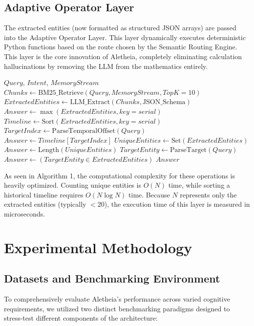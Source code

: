 \documentclass[journal,10pt]{IEEEtran}
\begin{document}
\subsection{Adaptive Operator Layer}
The extracted entities (now formatted as structured JSON arrays) are passed into the Adaptive Operator Layer. This layer dynamically executes deterministic Python functions based on the route chosen by the Semantic Routing Engine. This layer is the core innovation of Aletheia, completely eliminating calculation hallucinations by removing the LLM from the mathematics entirely.

\begin{algorithm}
\caption{Adaptive Operator Execution Pipeline}
\begin{algorithmic}[1]
\REQUIRE $Query$, $Intent$, $MemoryStream$
\STATE $Chunks \gets \text{BM25\_Retrieve}(Query, MemoryStream, TopK=10)$
\STATE $ExtractedEntities \gets \text{LLM\_Extract}(Chunks, \text{JSON\_Schema})$
    \STATE $Answer \gets \max(ExtractedEntities, key=serial)$
    \STATE $Timeline \gets \text{Sort}(ExtractedEntities, key=serial)$
    \STATE $TargetIndex \gets \text{ParseTemporalOffset}(Query)$
    \STATE $Answer \gets Timeline[TargetIndex]$ 
    \STATE $UniqueEntities \gets \text{Set}(ExtractedEntities)$
    \STATE $Answer \gets \text{Length}(UniqueEntities)$
    \STATE $TargetEntity \gets \text{ParseTarget}(Query)$
    \STATE $Answer \gets (TargetEntity \in ExtractedEntities)$
\ENDIF
\RETURN $Answer$
\end{algorithmic}
\end{algorithm}

As seen in Algorithm 1, the computational complexity for these operations is heavily optimized. Counting unique entities is $O(N)$ time, while sorting a historical timeline requires $O(N \log N)$ time. Because $N$ represents only the extracted entities (typically $< 20$), the execution time of this layer is measured in microseconds.

\section{Experimental Methodology}

\subsection{Datasets and Benchmarking Environment}
To comprehensively evaluate Aletheia's performance across varied cognitive requirements, we utilized two distinct benchmarking paradigms designed to stress-test different components of the architecture:
\end{document}

